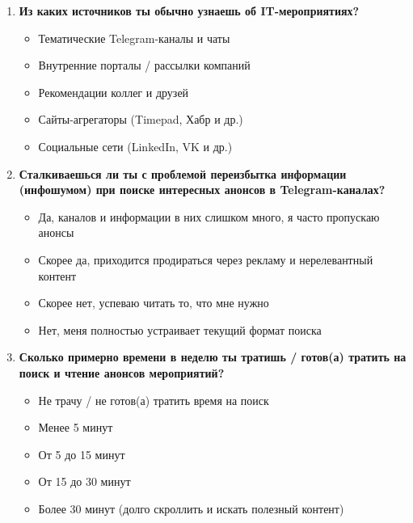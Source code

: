 \begin{enumerate}
    \vspace{1em}

    \item \textbf{Из каких источников ты обычно узнаешь об IT-мероприятиях?}
    \begin{itemize}
        \item[$\bigcirc$] Тематические Telegram-каналы и чаты
        \item[$\bigcirc$] Внутренние порталы / рассылки компаний
        \item[$\bigcirc$] Рекомендации коллег и друзей
        \item[$\bigcirc$] Сайты-агрегаторы (Timepad, Хабр и др.)
        \item[$\bigcirc$] Социальные сети (LinkedIn, VK и др.)
    \end{itemize}

    \vspace{1em}

    \item \textbf{Сталкиваешься ли ты с проблемой переизбытка информации (инфошумом) при поиске интересных анонсов в Telegram-каналах?}
    \begin{itemize}
        \item[$\bigcirc$] Да, каналов и информации в них слишком много, я часто пропускаю анонсы
        \item[$\bigcirc$] Скорее да, приходится продираться через рекламу и нерелевантный контент
        \item[$\bigcirc$] Скорее нет, успеваю читать то, что мне нужно
        \item[$\bigcirc$] Нет, меня полностью устраивает текущий формат поиска
    \end{itemize}

    \vspace{1em}

    \item \textbf{Сколько примерно времени в неделю ты тратишь / готов(а) тратить на поиск и чтение анонсов мероприятий?}
    \begin{itemize}
        \item[$\bigcirc$] Не трачу / не готов(а) тратить время на поиск
        \item[$\bigcirc$] Менее 5 минут
        \item[$\bigcirc$] От 5 до 15 минут
        \item[$\bigcirc$] От 15 до 30 минут
        \item[$\bigcirc$] Более 30 минут (долго скроллить и искать полезный контент)
    \end{itemize}


\end{enumerate}

